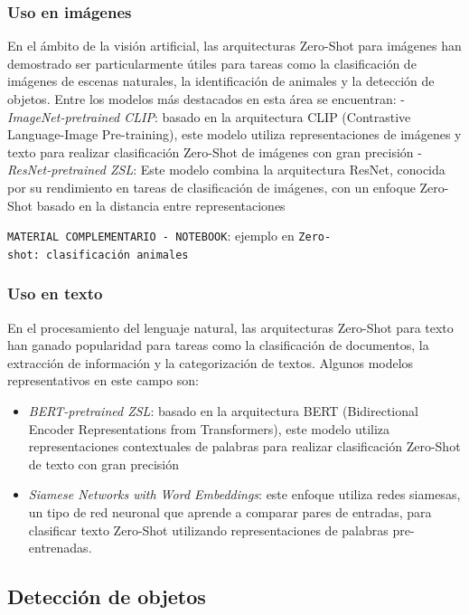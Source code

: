 \documentclass[
  a4paper,
  DIV=11,
  numbers=noendperiod]{scrreprt}
\providecommand{\tightlist}{%
  \setlength{\itemsep}{0pt}\setlength{\parskip}{0pt}}\usepackage{longtable,booktabs,array}
\begin{document}
\subsubsection{Uso en imágenes}\label{uso-en-imuxe1genes}

En el ámbito de la visión artificial, las arquitecturas Zero-Shot para
imágenes han demostrado ser particularmente útiles para tareas como la
clasificación de imágenes de escenas naturales, la identificación de
animales y la detección de objetos. Entre los modelos más destacados en
esta área se encuentran: - \emph{ImageNet-pretrained CLIP}: basado en la
arquitectura CLIP (Contrastive Language-Image Pre-training), este modelo
utiliza representaciones de imágenes y texto para realizar clasificación
Zero-Shot de imágenes con gran precisión - \emph{ResNet-pretrained ZSL}:
Este modelo combina la arquitectura ResNet, conocida por su rendimiento
en tareas de clasificación de imágenes, con un enfoque Zero-Shot basado
en la distancia entre representaciones

\texttt{MATERIAL\ COMPLEMENTARIO\ -\ NOTEBOOK}: ejemplo en
\texttt{Zero-shot:\ clasificación\ animales}

\subsubsection{Uso en texto}\label{uso-en-texto}

En el procesamiento del lenguaje natural, las arquitecturas Zero-Shot
para texto han ganado popularidad para tareas como la clasificación de
documentos, la extracción de información y la categorización de textos.
Algunos modelos representativos en este campo son:

\begin{itemize}
\tightlist
\item
  \emph{BERT-pretrained ZSL}: basado en la arquitectura BERT
  (Bidirectional Encoder Representations from Transformers), este modelo
  utiliza representaciones contextuales de palabras para realizar
  clasificación Zero-Shot de texto con gran precisión
\item
  \emph{Siamese Networks with Word Embeddings}: este enfoque utiliza
  redes siamesas, un tipo de red neuronal que aprende a comparar pares
  de entradas, para clasificar texto Zero-Shot utilizando
  representaciones de palabras pre-entrenadas.
\end{itemize}

\subsection{Detección de objetos}\label{detecciuxf3n-de-objetos}
\end{document}
